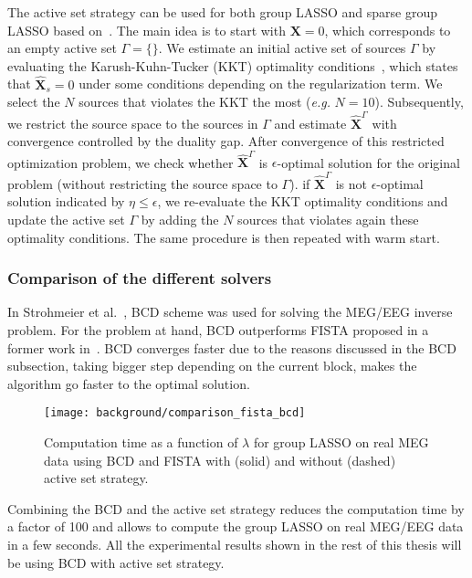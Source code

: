 The active set strategy can be used for both group LASSO and sparse group LASSO based on~\cite{roth2008group,wang2014two}. The main idea is to start with $\mathbf{X}=0$, which corresponds to an empty active set $\Gamma=\{\}$. We estimate an initial active set of sources $\Gamma$ by evaluating the Karush-Kuhn-Tucker (KKT) optimality conditions~\cite{roth2008group,wang2014two}, which states that $\hat{\mathbf{X}}_s=0$ under some conditions depending on the regularization term. We select the $N$ sources that violates the KKT the most (\textit{e.g.} $N=10$). Subsequently, we restrict the source space to the sources in $\Gamma$ and estimate $\hat{\mathbf{X}}^{\Gamma}$ with convergence controlled by the duality gap. After convergence of this restricted optimization problem, we check whether $\hat{\mathbf{X}}^{\Gamma}$ is $\epsilon$-optimal solution for the original problem (without restricting the source space to $\Gamma$). if $\hat{\mathbf{X}}^{\Gamma}$ is not $\epsilon$-optimal solution indicated by $\eta \leq \epsilon$, we re-evaluate the KKT optimality conditions and update the active set $\Gamma$ by adding the $N$ sources that violates again these optimality conditions. The same procedure is then repeated with warm start.


\subsubsection*{Comparison of the different solvers}
In Strohmeier et al.~\cite{strohmeier-etal:16}, BCD scheme was used for solving the MEG/EEG inverse problem. For the problem at hand, BCD outperforms FISTA proposed in a former work in~\cite{gramfort2012mixed}. BCD converges faster due to the reasons discussed in the BCD subsection, taking bigger step depending on the current block, makes the algorithm go faster to the optimal solution.

\begin{figure}
	\centering
	\texttt{[image: background/comparison\_fista\_bcd]}
    \caption{Computation time as a function of $\lambda$ for group LASSO on real MEG data using BCD and FISTA with (solid) and without (dashed) active set strategy.}
    \label{fig:comparison_fista_bcd}
\end{figure}
Combining the BCD and the active set strategy reduces the computation time by a factor of 100 and allows to compute the group LASSO on real MEG/EEG data in a few seconds. All the experimental results shown in the rest of this thesis will be using BCD with active set strategy.

